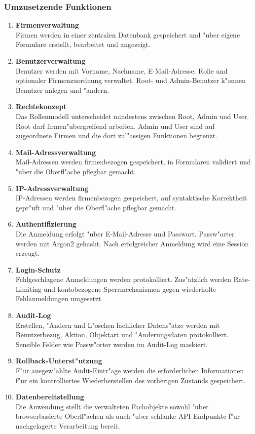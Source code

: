\subsubsection*{Umzusetzende Funktionen}
\begin{enumerate}
\item \textbf{Firmenverwaltung}\\
      Firmen werden in einer zentralen Datenbank gespeichert und "uber
      eigene Formulare erstellt, bearbeitet und angezeigt.
\item \textbf{Benutzerverwaltung}\\
      Benutzer werden mit Vorname, Nachname, E-Mail-Adresse, Rolle und optionaler
      Firmenzuordnung verwaltet. Root- und Admin-Benutzer k"onnen
      Benutzer anlegen und "andern.
\item \textbf{Rechtekonzept}\\
      Das Rollenmodell unterscheidet mindestens zwischen Root, Admin und User.
      Root darf firmen"ubergreifend arbeiten. Admin und User sind auf
      zugeordnete Firmen und die dort zul"assigen Funktionen begrenzt.
\item \textbf{Mail-Adressverwaltung}\\
      Mail-Adressen werden firmenbezogen gespeichert, in Formularen
      validiert und "uber die Oberfl"ache pflegbar gemacht.
\item \textbf{IP-Adressverwaltung}\\
      IP-Adressen werden firmenbezogen gespeichert, auf syntaktische
      Korrektheit gepr"uft und "uber die Oberfl"ache pflegbar gemacht.
\item \textbf{Authentifizierung}\\
      Die Anmeldung erfolgt "uber E-Mail-Adresse und Passwort. Passw"orter werden
      mit Argon2 gehasht. Nach erfolgreicher Anmeldung wird eine Session erzeugt.
\item \textbf{Login-Schutz}\\
      Fehlgeschlagene Anmeldungen werden protokolliert. Zus"atzlich werden
      Rate-Limiting und kontobezogene Sperrmechanismen gegen wiederholte
      Fehlanmeldungen umgesetzt.
\item \textbf{Audit-Log}\\
      Erstellen, "Andern und L"oschen fachlicher Datens"atze werden mit
      Benutzerbezug, Aktion, Objektart und "Anderungsdaten protokolliert.
      Sensible Felder wie Passw"orter werden im Audit-Log maskiert.
\item \textbf{Rollback-Unterst"utzung}\\
      F"ur ausgew"ahlte Audit-Eintr"age werden die erforderlichen Informationen
      f"ur ein kontrolliertes Wiederherstellen des vorherigen Zustands
      gespeichert.
\item \textbf{Datenbereitstellung}\\
      Die Anwendung stellt die verwalteten Fachobjekte sowohl "uber
      browserbasierte Oberfl"achen als auch "uber schlanke API-Endpunkte f"ur
      nachgelagerte Verarbeitung bereit.
\end{enumerate}

